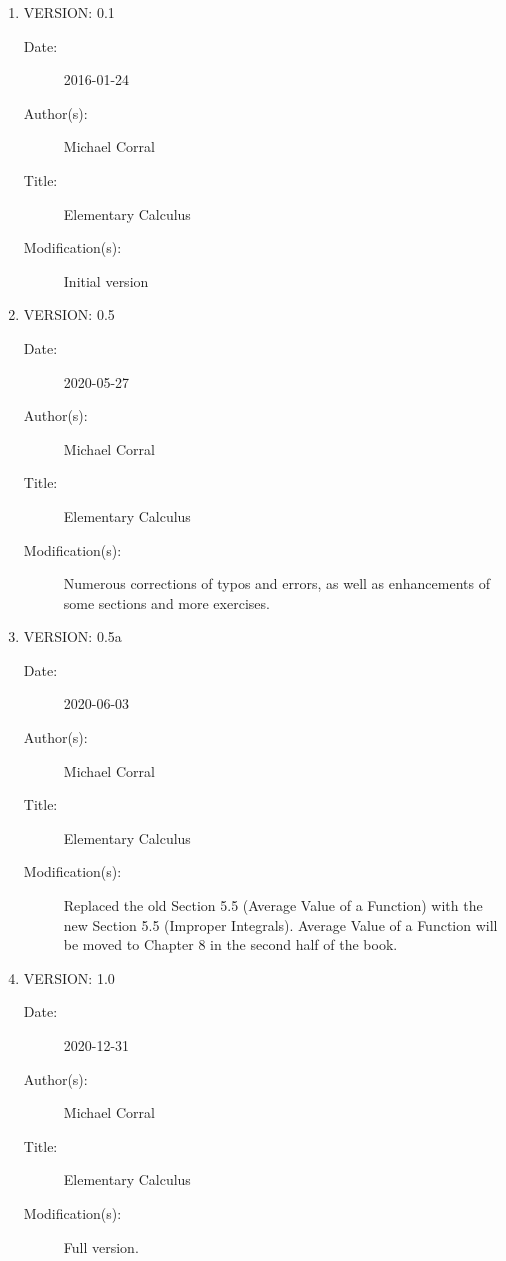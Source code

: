 \documentclass[paper=letter,fontsize=11pt,headings=big,chapterprefix=false,
appendixprefix,twoside,titlepage,open=any,numbers=noenddot,
index=totoc]{scrbook}
\theoremstyle{definition}
\theoremstyle{itexmp}
\newcommand\myclearpage{\cleartooddpage
 [\thispagestyle{empty}]}
\numberwithin{figure}{section}
\begin{document}
\begin{enumerate}

\item VERSION: 0.1
\begin{description}
\item[Date:] 2016-01-24
\item[Author(s):] Michael Corral
\item[Title:] Elementary Calculus
\item[Modification(s):] Initial version
\end{description}

\item VERSION: 0.5
\begin{description}
\item[Date:] 2020-05-27
\item[Author(s):] Michael Corral
\item[Title:] Elementary Calculus
\item[Modification(s):] Numerous corrections of typos and errors, as well as
enhancements of some sections and more exercises.
\end{description}

\item VERSION: 0.5a
\begin{description}
\item[Date:] 2020-06-03
\item[Author(s):] Michael Corral
\item[Title:] Elementary Calculus
\item[Modification(s):] Replaced the old Section 5.5 (Average Value of a
Function) with the new Section 5.5 (Improper Integrals). Average Value of a
Function will be moved to Chapter 8 in the second half of the book.
\end{description}

\item VERSION: 1.0
\begin{description}
\item[Date:] 2020-12-31
\item[Author(s):] Michael Corral
\item[Title:] Elementary Calculus
\item[Modification(s):] Full version.
\end{description}

\end{enumerate}

\backmatter
\clearpage
{}
\printindex

\myclearpage
\end{document}
